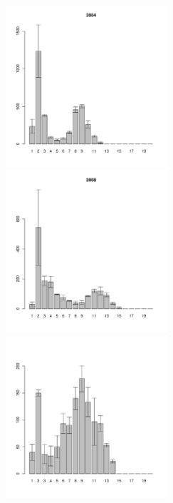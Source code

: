 \documentclass[12pt, a4paper]{article}
\begin{document}
\begin{figure}[h]

\begin{multicols}{3}
\hfill
\includegraphics[width=60mm]{../White_Sea/Estuatiy_Luvenga/sizestr_2004_.pdf}
\hfill
\includegraphics[width=60mm]{../White_Sea/Estuatiy_Luvenga/sizestr_2008_.pdf}
\hfill
\includegraphics[width=60mm]{../White_Sea/Estuatiy_Luvenga/sizestr_2012_.pdf}
\end{multicols}




\end{figure}
\end{document}
